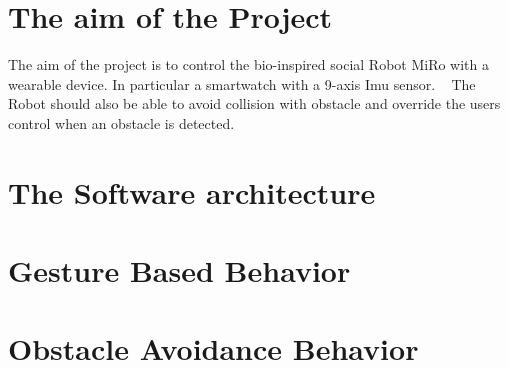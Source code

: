 \hypertarget{index_aim_sec}{}\section{The aim of the Project}\label{index_aim_sec}
The aim of the project is to control the bio-\/inspired social Robot Mi\+Ro with a wearable device. In particular a smartwatch with a 9-\/axis Imu sensor. ~\newline
 The Robot should also be able to avoid collision with obstacle and override the user\textquotesingle{}s control when an obstacle is detected. \hypertarget{index_sofar_sec}{}\section{The Software architecture}\label{index_sofar_sec}
\hypertarget{index_gbb_sec}{}\section{Gesture Based Behavior}\label{index_gbb_sec}
\hypertarget{index_aob_sec}{}\section{Obstacle Avoidance Behavior}\label{index_aob_sec}
